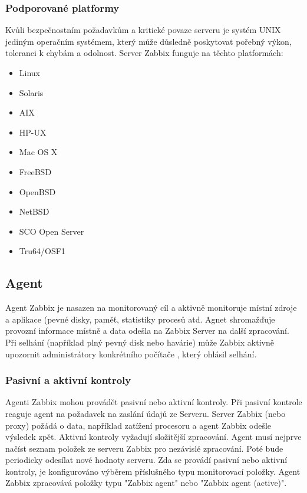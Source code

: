 \documentclass{article}
\begin{document}
\subsubsection{Podporované platformy}

Kvůli bezpečnostním požadavkům a kritické povaze serveru je systém UNIX jediným operačním systémem, který může důsledně poskytovat pořebný výkon, toleranci k chybám a odolnost.
Server Zabbix funguje na těchto platformách:
\begin{itemize}
   \item Linux
   \item Solaris
   \item AIX
   \item HP-UX
   \item Mac OS X
   \item FreeBSD
   \item OpenBSD
   \item NetBSD
   \item SCO Open Server
   \item Tru64/OSF1
\end{itemize}
\subsection{Agent}
Agent Zabbix je nasazen na monitorovaný cíl a aktivně monitoruje místní zdroje a aplikace (pevné disky, paměť, statistiky procesů atd.
Agnet shromažďuje provozní informace místně a data odešla na Zabbix Server na další zpracování. Při selhání (například plný pevný disk nebo havárie) může Zabbix aktivně upozornit administrátory konkrétního počítače , který ohlásil selhání.
\subsubsection{Pasivní a aktivní kontroly}
Agenti Zabbix mohou provádět pasivní nebo aktivní kontroly.\newline
Při pasivní kontrole reaguje agent na požadavek na zaslání údajů ze Serveru. Server Zabbix (nebo proxy) požádá o data, například zatížení procesoru a agent Zabbix odešle výsledek zpět.\newline
Aktivní kontroly vyžadují složitější zpracování. Agent musí nejprve načíst seznam položek ze serveru Zabbix pro nezávislé zpracování. Poté bude periodicky odesílat nové hodnoty serveru.
Zda se provádí pasivní nebo aktivní kontroly, je konfigurováno výběrem příslušného typu monitorovací položky. Agent Zabbix zpracovává položky typu "Zabbix agent" nebo "Zabbix agent (active)".
\end{document}
